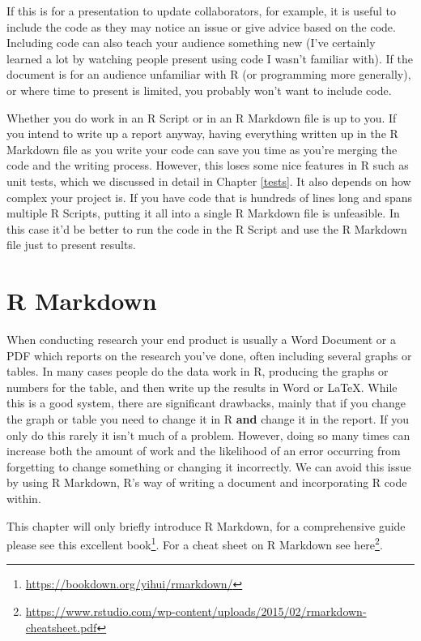\documentclass[
]{krantz}
\renewcommand{\href}[2]{#2\footnote{\url{#1}}}
\begin{document}
If this is for a presentation to update collaborators, for example, it is useful to include the code as they may notice an issue or give advice based on the code. Including code can also teach your audience something new (I've certainly learned a lot by watching people present using code I wasn't familiar with). If the document is for an audience unfamiliar with R (or programming more generally), or where time to present is limited, you probably won't want to include code.

Whether you do work in an R Script or in an R Markdown file is up to you. If you intend to write up a report anyway, having everything written up in the R Markdown file as you write your code can save you time as you're merging the code and the writing process. However, this loses some nice features in R such as unit tests, which we discussed in detail in Chapter \ref{tests}. It also depends on how complex your project is. If you have code that is hundreds of lines long and spans multiple R Scripts, putting it all into a single R Markdown file is unfeasible. In this case it'd be better to run the code in the R Script and use the R Markdown file just to present results.

\hypertarget{r-markdown}{%
\chapter{R Markdown}\label{r-markdown}}

When conducting research your end product is usually a Word Document or a PDF which reports on the research you've done, often including several graphs or tables. In many cases people do the data work in R, producing the graphs or numbers for the table, and then write up the results in Word or LaTeX. While this is a good system, there are significant drawbacks, mainly that if you change the graph or table you need to change it in R \textbf{and} change it in the report. If you only do this rarely it isn't much of a problem. However, doing so many times can increase both the amount of work and the likelihood of an error occurring from forgetting to change something or changing it incorrectly. We can avoid this issue by using R Markdown, R's way of writing a document and incorporating R code within.

This chapter will only briefly introduce R Markdown, for a comprehensive guide please see \href{https://bookdown.org/yihui/rmarkdown/}{this excellent book}. For a cheat sheet on R Markdown see \href{https://www.rstudio.com/wp-content/uploads/2015/02/rmarkdown-cheatsheet.pdf}{here}.
\end{document}
